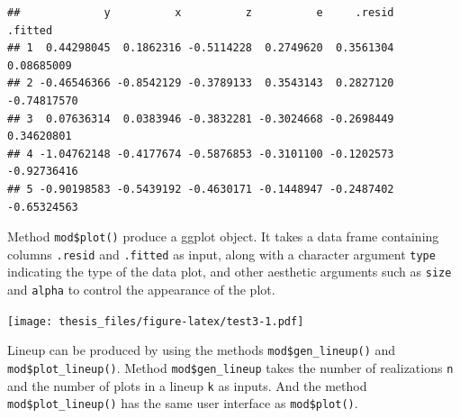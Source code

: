 \documentclass{monashthesis}
\theoremstyle{definition}
\theoremstyle{definition}
\theoremstyle{definition}
\theoremstyle{definition}
\theoremstyle{remark}
\begin{document}
\begin{Shaded}
\begin{Highlighting}[]
\SpecialCharTok{$}\NormalTok{(} \NormalTok{, } \NormalTok{)}
\end{Highlighting}
\end{Shaded}

\begin{verbatim}
##             y          x          z          e     .resid     .fitted
## 1  0.44298045  0.1862316 -0.5114228  0.2749620  0.3561304  0.08685009
## 2 -0.46546366 -0.8542129 -0.3789133  0.3543143  0.2827120 -0.74817570
## 3  0.07636314  0.0383946 -0.3832281 -0.3024668 -0.2698449  0.34620801
## 4 -1.04762148 -0.4177674 -0.5876853 -0.3101100 -0.1202573 -0.92736416
## 5 -0.90198583 -0.5439192 -0.4630171 -0.1448947 -0.2487402 -0.65324563
\end{verbatim}

Method \texttt{mod\$plot()} produce a ggplot \autocite{wickham_ggplot2_2011} object. It takes a data frame containing columns \texttt{.resid} and \texttt{.fitted} as input, along with a character argument \texttt{type} indicating the type of the data plot, and other aesthetic arguments such as \texttt{size} and \texttt{alpha} to control the appearance of the plot.

\begin{Shaded}
\begin{Highlighting}[]
\SpecialCharTok{$}\SpecialCharTok{$}\NormalTok{(} \NormalTok{, } \NormalTok{), } \NormalTok{, } \NormalTok{)}
\end{Highlighting}
\end{Shaded}

\texttt{[image: thesis\_files/figure-latex/test3-1.pdf]}

Lineup can be produced by using the methods \texttt{mod\$gen\_lineup()} and \texttt{mod\$plot\_lineup()}. Method \texttt{mod\$gen\_lineup} takes the number of realizations \texttt{n} and the number of plots in a lineup \texttt{k} as inputs. And the method \texttt{mod\$plot\_lineup()} has the same user interface as \texttt{mod\$plot()}.

\begin{Shaded}
\begin{Highlighting}[]
\SpecialCharTok{$}\SpecialCharTok{$}\NormalTok{(} \NormalTok{, } \NormalTok{), } \NormalTok{, } \NormalTok{)}
\end{Highlighting}
\end{Shaded}
\end{document}
